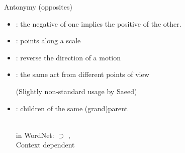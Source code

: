 \begin{frame}[allowframebreaks]{Antonymy (opposites)}


\begin{itemize}
\item {}: the negative of one implies the positive of the other.
  \begin{exe}
    \ex {}
    \ex {}
  \end{exe}
\item {}: points  along a scale
  \begin{exe}
    \ex {}
    \ex {}
  \end{exe}
\item {}: reverse the direction of a motion
  \begin{exe}
    \ex {}
    \ex {}
  \end{exe}
\framebreak
\item {}: the same act from different points of view
  \begin{exe}
    \ex {}
    \ex {}
  \end{exe}
  (Slightly non-standard usage by Saeed)
\item {}: children of the same (grand)parent
  \begin{exe}
    \ex {}
    \\ \textnormal{in WordNet:}  $\supset$ , 
    \ex {}
    \\  \textnormal{Context dependent}
  \end{exe}
\end{itemize}
\end{frame}

